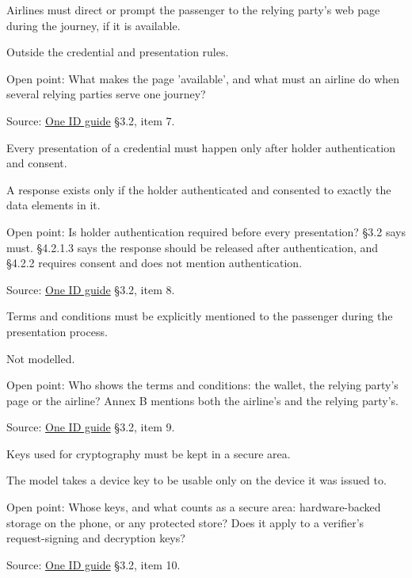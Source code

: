 \begin{definition}
  \label{def:c21}
  \notready
  Airlines must direct or prompt the passenger to the relying party's web
  page during the journey, if it is available.

  Outside the credential and presentation rules.

  Open point: What makes the page 'available', and what must an airline do
  when several relying parties serve one journey?

  Source:
  \href{https://standards.atlassian.net/wiki/spaces/OneID/pages/2947416082/Technical+Implementation+Guide}{One
  ID guide} §3.2, item 7.
\end{definition}

\begin{definition}
  \label{def:c22}
  \notready
  Every presentation of a credential must happen only after holder
  authentication and consent.

  A response exists only if the holder authenticated and consented to exactly
  the data elements in it.

  Open point: Is holder authentication required before every presentation?
  §3.2 says must. §4.2.1.3 says the response should be released after
  authentication, and §4.2.2 requires consent and does not mention
  authentication.

  Source:
  \href{https://standards.atlassian.net/wiki/spaces/OneID/pages/2947416082/Technical+Implementation+Guide}{One
  ID guide} §3.2, item 8.
\end{definition}

\begin{definition}
  \label{def:c23}
  \notready
  Terms and conditions must be explicitly mentioned to the passenger during
  the presentation process.

  Not modelled.

  Open point: Who shows the terms and conditions: the wallet, the relying
  party's page or the airline? Annex B mentions both the airline's and the
  relying party's.

  Source:
  \href{https://standards.atlassian.net/wiki/spaces/OneID/pages/2947416082/Technical+Implementation+Guide}{One
  ID guide} §3.2, item 9.
\end{definition}

\begin{definition}
  \label{def:c24}
  \notready
  Keys used for cryptography must be kept in a secure area.

  The model takes a device key to be usable only on the device it was issued
  to.

  Open point: Whose keys, and what counts as a secure area: hardware-backed
  storage on the phone, or any protected store? Does it apply to a verifier's
  request-signing and decryption keys?

  Source:
  \href{https://standards.atlassian.net/wiki/spaces/OneID/pages/2947416082/Technical+Implementation+Guide}{One
  ID guide} §3.2, item 10.
\end{definition}
